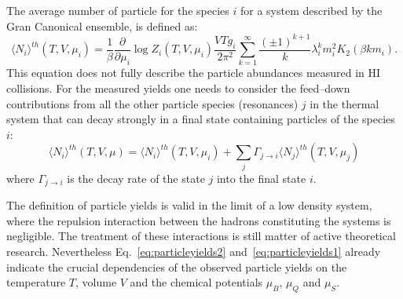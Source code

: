 The average number of particle for the species $i$ for a system described by the Gran
Canonical ensemble, is defined as:
\begin{equation} \label{eq:particleyields1}
    \langle N_{i} \rangle ^{th} (T,V,\mu_{i}) = \frac{1}{\beta} \frac{\partial}{\partial \mu_{i}}
    \log Z_{i}(T,V,\mu_{i})
    \frac{V T g_{i}}{2 \pi^{2}}
    \sum_{k=1}^{\infty} \frac{(\pm 1)^{k+1}}{k} \lambda^{k}_{i} m_{i}^{2} K_{2}(\beta k m_{i}).
\end{equation}
This equation does not fully describe the particle abundances measured in HI collisions.
For the measured yields one needs to consider the feed–down contributions from all the other
particle species (resonances) $j$ in the thermal system that can decay strongly in a final
state containing particles of the species $i$:
\begin{equation} \label{eq:particleyields2}
    \langle N_{i} \rangle ^{th} (T,V,\mu) = \langle N_{i} \rangle ^{th} (T,V,\mu_{i})
    + \sum_{j} \Gamma_{j \to i} \langle N_{j} \rangle ^{th} (T,V,\mu_{j})
\end{equation}
where $\Gamma_{j \to i}$ is the decay rate of the state $j$ into the final state $i$.

The definition of particle yields is valid in the limit of a low density system, 
where the repulsion interaction between the hadrons constituting the systems is negligible.
The treatment of these interactions is still matter of active theoretical research. Nevertheless 
Eq.~\eqref{eq:particleyields2} and~\eqref{eq:particleyields1} already indicate the crucial 
dependencies of the observed particle yields on the
temperature $T$, volume $V$ and the chemical potentials $\mu_B$, $\mu_Q$ and $\mu_S$.

